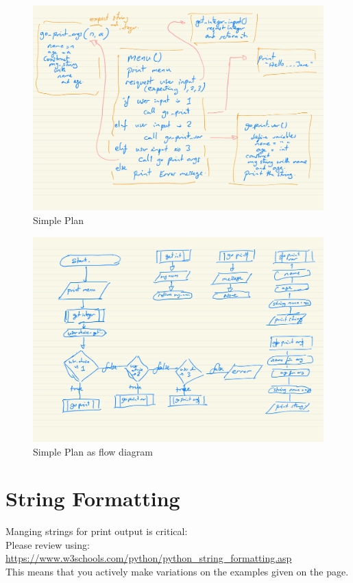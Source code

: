 \documentclass[a4paper,12pt]{article}
\begin{document}
\begin{figure}[!ht]
	\centering
	\includegraphics[width=15cm]{function_plan_1.pdf}
	\caption*{Simple Plan}
\end{figure}

\begin{figure}[!ht]
	\centering
	\includegraphics[width=15cm]{function_plan_2_flow_diagram.pdf}
	\caption*{Simple Plan as flow diagram}
\end{figure}

\newpage
\section{String Formatting}
Manging strings for print output is critical:\\

Please review using:\\
\url{https://www.w3schools.com/python/python_string_formatting.asp}\\
This means that you actively make variations on the examples given on the page.
\end{document}
